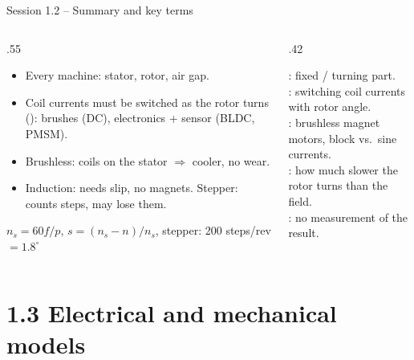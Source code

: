 \documentclass[aspectratio=169,10pt]{beamer}
\begin{document}
\begin{frame}{Session 1.2 -- Summary and key terms}
\begin{columns}[T]
\begin{column}{.55\textwidth}
\small
\begin{itemize}
\item Every machine: stator, rotor, air gap.
\item Coil currents must be switched as the rotor turns (): brushes (DC), electronics + sensor (BLDC, PMSM).
\item Brushless: coils on the stator $\Rightarrow$ cooler, no wear.
\item Induction: needs slip, no magnets. Stepper: counts steps, may lose them.
\end{itemize}
\begin{keybox}[Remember]
$n_s=60f/p$, \quad $s=(n_s-n)/n_s$, \quad stepper: 200 steps/rev $=1.8^\circ$
\end{keybox}
\end{column}
\begin{column}{.42\textwidth}
\begin{defbox}
\small
{}: fixed / turning part.\\
: switching coil currents with rotor angle.\\
: brushless magnet motors, block vs.\ sine currents.\\
: how much slower the rotor turns than the field.\\
: no measurement of the result.
\end{defbox}
\end{column}
\end{columns}
\end{frame}

\section{1.3 Electrical and mechanical models}
\end{document}
